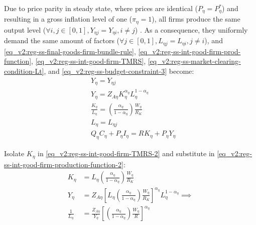 \documentclass[../thesis.tex]{subfiles}
\begin{document}
Due to price parity in steady state, where prices are identical ($P_{\eta} = P_{\eta}^{\ast}$) and resulting in a gross inflation level of one ($\pi_{\eta} = 1$), all firms produce the same output level ($\forall i, j \in [0,1], Y_{\eta j} = Y_{\eta i}, i \neq j$) \cite[Lecture 13, p.12]{solis-garcia_ucb_2022}. As a consequence, they uniformly demand the same amount of factors ($\forall j \in [0,1], L_{\eta j} = L_{\eta i}, j \neq i$), and \ref{eq_v2:reg-ss-final-goods-firm-bundle-rule}, \ref{eq_v2:reg-ss-int-good-firm-prod-function}, \ref{eq_v2:reg-ss-int-good-firm-TMRS}, \ref{eq_v2:reg-ss-market-clearing-condition-Lt}, and \ref{eq_v2:reg-ss-budget-constraint-3} become:
\begin{align}
	& Y_{\eta} = Y_{\eta j} \label{eq_v2:reg-ss-final-goods-firm-bundle-rule-2} \\
	& Y_{\eta} = Z_{A\eta} K_{\eta}^{\alpha_{\eta}} L_{\eta}^{1-{\alpha_{\eta}}} \label{eq_v2:reg-ss-int-good-firm-production-function-2} \\
	& \frac{K_{\eta}}{L_{\eta}} = \left( \frac{{\alpha_{\eta}}}{1-\alpha_{\eta}} \right) \frac{W_{\eta}}{R_{K}} \label{eq_v2:reg-ss-int-good-firm-TMRS-2} \\
	& L_{\eta} = L_{\eta j} \label{eq_v2:reg-ss-market-clearing-condition-Lt-2} \\
	& Q_{\eta} C_{\eta} + P_{\eta} I_{\eta} = R_{} K_{\eta} + P_{\eta} Y_{\eta} \label{eq_v2:reg-ss-budget-constraint-4}
\end{align}


Isolate $K_{\eta}$ in \ref{eq_v2:reg-ss-int-good-firm-TMRS-2} and substitute in \ref{eq_v2:reg-ss-int-good-firm-production-function-2}:
\begin{align}
	K_{\eta} &= L_{\eta} \left( \frac{{\alpha_{\eta}}}{1-\alpha_{\eta}} \right) \frac{W_{\eta}}{R_{K}} \nonumber \\
	Y_{\eta} &= Z_{A\eta} \left[ L_{\eta} \left( \frac{{\alpha_{\eta}}}{1-\alpha_{\eta}} \right) \frac{W_{\eta}}{R_{K}} \right]^{\alpha_{\eta}} L_{\eta}^{1-{\alpha_{\eta}}} \implies \nonumber \\
	\frac{1}{L_{\eta}} &= \frac{Z_{A\eta}}{Y_{\eta}} \left[ \left( \frac{{\alpha_{\eta}}}{1-\alpha_{\eta}} \right) \frac{W_{\eta}}{R} \right]^{\alpha_{\eta}} \label{eq_v2:reg-ss-int-good-firm-production-function-3}
\end{align}
\end{document}
